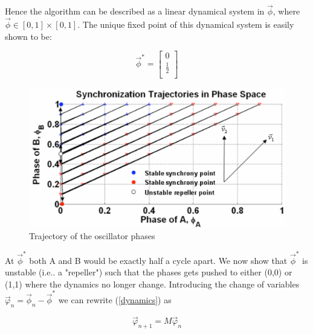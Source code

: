 
Hence the algorithm can be described as a
linear dynamical system in $\vec{\phi}$, where $\vec{\phi} \in
[0,1] \times [0, 1]$. The unique fixed point of this dynamical
system is easily shown to be:

\begin{equation}\label{fixedPtDefn}
\vec{\phi}^*=
\begin{bmatrix}
  0 \\
  \frac{1}{2} \\
\end{bmatrix}
\end{equation}

\begin{figure}[t]
\begin{center}
\includegraphics[width=1.0\hsize]{./figures/theory-trajectory.pdf}
\end{center}
\caption{Trajectory of the oscillator phases}
\label{fig:theory1}
\end{figure}

At $\vec{\phi}^*$ both A and B would be exactly half a cycle apart. We
now show that $\vec{\phi}^*$ is unstable (i.e.. a "repeller") such that
the phases gets pushed to either (0,0) or (1,1) where the dynamics no
longer change. Introducing the change of variables
$\vec{\varphi}_n=\vec{\phi}_n-\vec{\phi}^* $ we can rewrite
(\ref{dynamics}) as

\begin{equation}\label{shiftEqn}
    \vec{\varphi}_{n+1}=M\vec{\varphi}_n
\end{equation}

